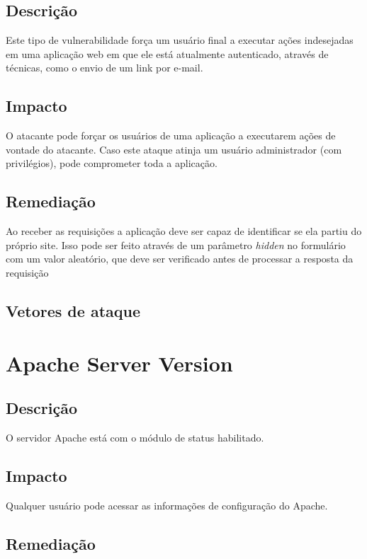 \documentclass{ufscThesis}
\newcommand{\+}{\discretionary{\mbox{${\bm\cdot}\mkern-1mu$}}{}{}}
\renewcommand\+{\discretionary{}{}{}}
\begin{document}
\subsection{Descrição}

Este tipo de vulnerabilidade força um usuário final a executar ações indesejadas em uma aplicação web em que ele está atualmente autenticado, através de técnicas, como o envio de um link por e-mail.

\subsection{Impacto}

O atacante pode forçar os usuários de uma aplicação a executarem ações de vontade do atacante. Caso este ataque atinja um usuário administrador (com privilégios), pode comprometer toda a aplicação.

\subsection{Remediação}

Ao receber as requisições a aplicação deve ser capaz de identificar se ela partiu do próprio site. Isso pode ser feito através de um parâmetro \emph{hidden} no formulário com um valor aleatório, que deve ser verificado antes de processar a resposta da requisição

\subsection{Vetores de ataque}

\section{Apache Server Version}

\subsection{Descrição}

O servidor Apache está com o módulo de status habilitado.

\subsection{Impacto}

Qualquer usuário pode acessar as informações de configuração do Apache.

\subsection{Remediação}
\end{document}
